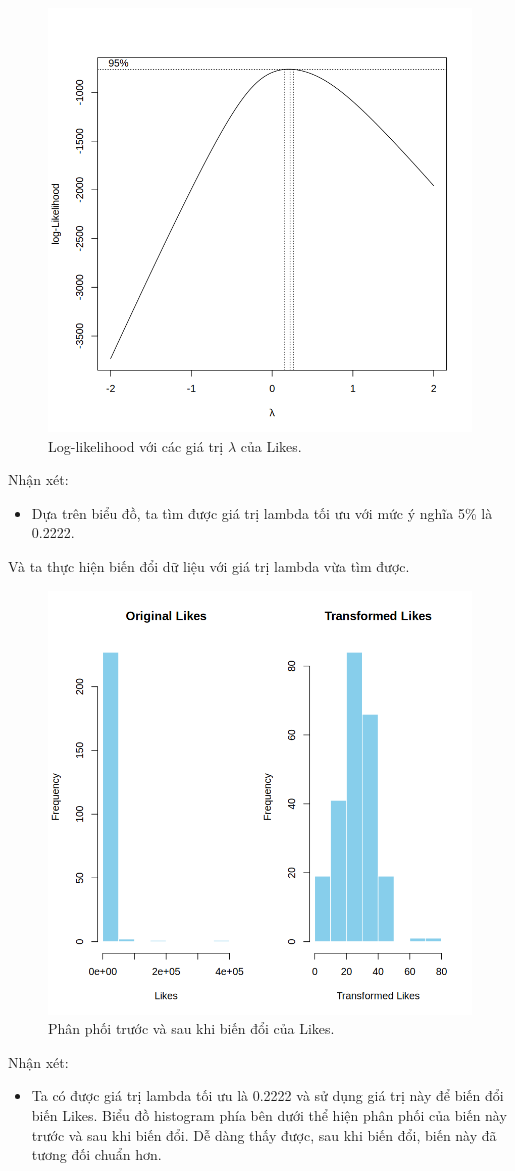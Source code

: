 \begin{figure}[H]
    \centering
    \includegraphics[width=0.75\columnwidth]{csm_figures/likes_optimal_lambda.png}
    \caption{Log-likelihood với các giá trị $\lambda$ của Likes.}
    \label{fig:likes_optimal_lambda}
\end{figure}
Nhận xét:
\begin{itemize}
    \item Dựa trên biểu đồ, ta tìm được giá trị lambda tối ưu với mức ý nghĩa 5\% là 0.2222.
\end{itemize}

Và ta thực hiện biến đổi dữ liệu với giá trị lambda vừa tìm được.
\begin{figure}[H]
    \centering
    \includegraphics[width=0.75\columnwidth]{csm_figures/likes_transformed_distribution.png}
    \caption{Phân phối trước và sau khi biến đổi của Likes.}
    \label{fig:likes_transformed_distribution}
\end{figure}
Nhận xét:
\begin{itemize}
    \item Ta có được giá trị lambda tối ưu là 0.2222 và sử dụng giá trị này để biến đổi biến Likes. Biểu đồ histogram phía bên dưới thể hiện phân phối của biến này trước và sau khi biến đổi. Dễ dàng thấy được, sau khi biến đổi, biến này đã tương đối chuẩn hơn.
\end{itemize}

